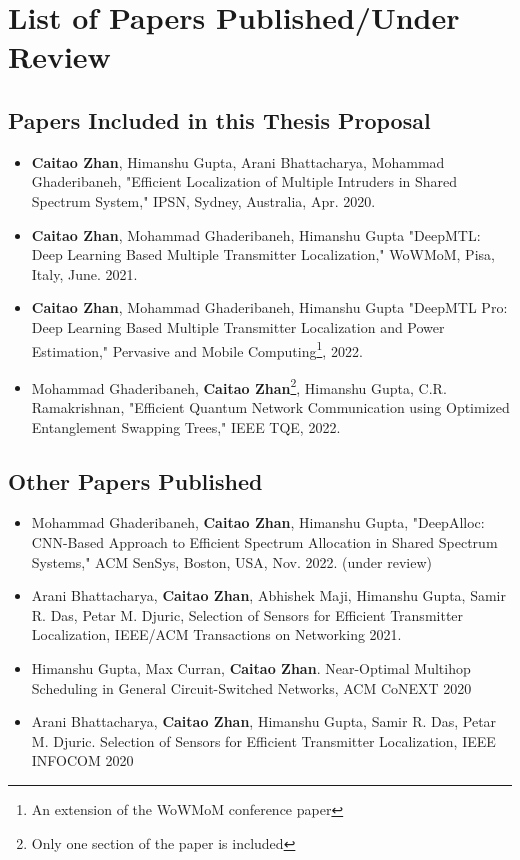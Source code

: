 \chapter{List of Papers Published/Under Review}

\section*{Papers Included in this Thesis Proposal}
\begin{itemize}
    \item \textbf{Caitao Zhan}, Himanshu Gupta, Arani Bhattacharya, Mohammad Ghaderibaneh, "Efficient Localization of Multiple Intruders in Shared Spectrum System," IPSN, Sydney, Australia, Apr. 2020.

    \item \textbf{Caitao Zhan}, Mohammad Ghaderibaneh, Himanshu Gupta "DeepMTL: Deep Learning Based Multiple Transmitter Localization," WoWMoM, Pisa, Italy, June. 2021. 

    \item \textbf{Caitao Zhan}, Mohammad Ghaderibaneh, Himanshu Gupta "DeepMTL Pro: Deep Learning Based Multiple Transmitter Localization and Power Estimation," Pervasive and Mobile Computing\footnote{An extension of the WoWMoM conference paper}, 2022.

    \item Mohammad Ghaderibaneh, \textbf{Caitao Zhan}\footnote{Only one section of the paper is included}, Himanshu Gupta, C.R. Ramakrishnan, "Efficient Quantum Network Communication using Optimized Entanglement Swapping Trees," IEEE TQE, 2022.

    
\end{itemize}

\section*{Other Papers Published}
\begin{itemize}

    \item Mohammad Ghaderibaneh, \textbf{Caitao Zhan}, Himanshu Gupta, "DeepAlloc: CNN-Based Approach to Efficient Spectrum Allocation in Shared Spectrum Systems," ACM SenSys, Boston, USA, Nov. 2022. (under review)

    \item Arani Bhattacharya, \textbf{Caitao Zhan}, Abhishek Maji, Himanshu Gupta, Samir R. Das, Petar M. Djuric, Selection of Sensors for Efficient Transmitter Localization, IEEE/ACM Transactions on Networking 2021.

    \item Himanshu Gupta, Max Curran, \textbf{Caitao Zhan}. Near-Optimal Multihop Scheduling in General Circuit-Switched Networks, ACM CoNEXT 2020
    
    \item Arani Bhattacharya, \textbf{Caitao Zhan}, Himanshu Gupta, Samir R. Das, Petar M. Djuric. Selection of Sensors for Efficient Transmitter Localization, IEEE INFOCOM 2020
  
\end{itemize}